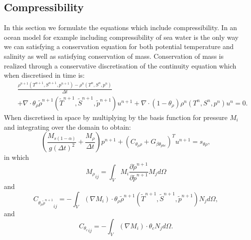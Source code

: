 \subsection{Compressibility}
\noindent 
In this section we formulate the equations which include compressibility. 
In an ocean model for example including compressibility 
of sea water is the only way we can satisfying a conservation 
equation for both potential temperature and salinity 
as well as satisfying conservation of mass. Conservation of 
mass is realized through a 
conservative discretisation of the continuity equation which 
when discretised in time is:  
\begin{eqnarray}
&&
\frac{\rho^{n+1}( T^{n+1}, S^{n+1}, p^{n+1}) - \rho^{n}( T^{n}, S^{n}, p^{n})} 
{\Delta t} 
 \nonumber\\ 
&& 
+
\nabla \cdot \theta_{\rho} \tilde  \rho^{n+1}
( \tilde T^{n+1}, \tilde S^{n+1}, \tilde p^{n+1}) u^{n+1}
+
\nabla \cdot (1-\theta_{\rho}) \rho^{n}
(  T^{n},  S^{n},  p^{n}) u^{n} =0. 
\label{div-u-row-time-disc} 
\end{eqnarray}   
When discretised in space by multiplying by the basis 
function for pressure $M_i$ and integrating over the domain 
to obtain: 
\begin{equation}
\left(\frac{M_{s(1-\alpha)}}{g (\Delta t)^2}+\frac{M_{\rho}}{\Delta t}\right)  p^{n+1} + (C_{\theta_\rho \rho} +G_{\beta\theta_{pbc}} )^T u^{n+1} = s_{\theta\rho}, 
\label{div-u-row-time-disc-space}     
\end{equation}
in which 
\begin{equation}
{M_{\rho}}_{ij}
=\int_V M_i \frac{\partial \tilde\rho^{n+1}}{\partial \tilde p^{n+1}}M_j d \Omega
\label{m-rho}     
\end{equation}
and 
\begin{equation}
{C_{\theta_\rho \tilde  \rho^{n+1}}}_{ij}
=-\int_V  (\nabla M_i )\cdot \theta_{\rho} \tilde  \rho^{n+1}
( \tilde T^{n+1}, \tilde S^{n+1}, \tilde p^{n+1})  N_j d \Omega, 
\label{c-rho}     
\end{equation}
and 
\begin{equation}
{C_{\theta_c}}_{ij}
=-\int_V  (\nabla M_i )\cdot \theta_{c}  N_j d \Omega. 
\label{c-c}  
\end{equation}   

